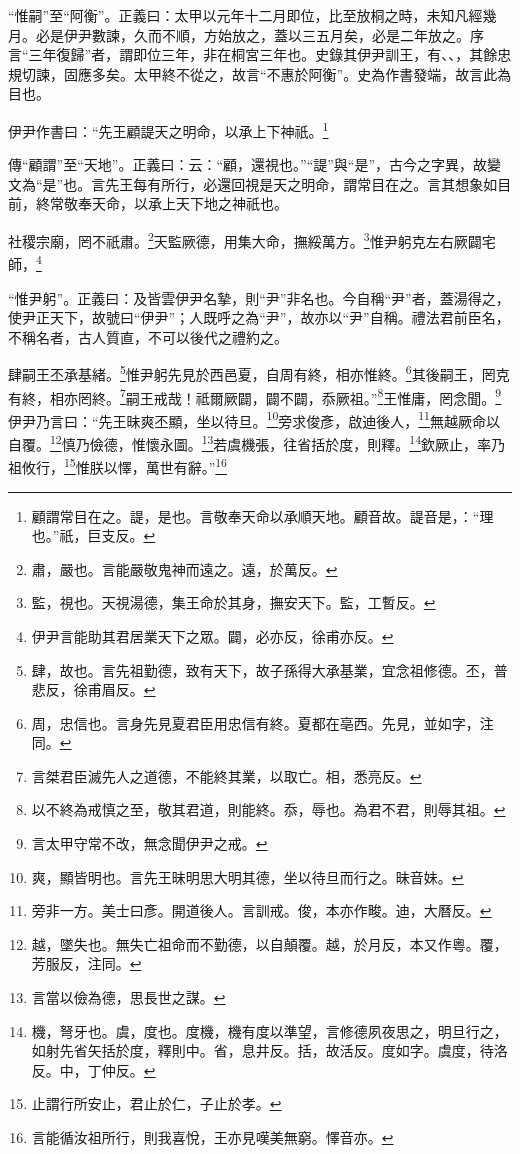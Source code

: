{\noindent\shu{}\fzkt “惟嗣”至“阿衡”。正義曰：太甲以元年十二月即位，比至放桐之時，未知凡經幾月。必是伊尹數諫，久而不順，方始放之，蓋以三五月矣，必是二年放之。序言“三年復歸”者，謂即位三年，非在桐宮三年也。史錄其伊尹訓王，有、、，其餘忠規切諫，固應多矣。太甲終不從之，故言“不惠於阿衡”。史為作書發端，故言此為目也。 \par}

伊尹作書曰：“先王顧諟天之明命，以承上下神祇。\footnote{顧謂常目在之。諟，是也。言敬奉天命以承順天地。顧音故。諟音是，：“理也。”祇，巨支反。}

{\noindent\zhuan{}\fzbyks 傳“顧謂”至“天地”。正義曰：云：“顧，還視也。”“諟”與“是”，古今之字異，故變文為“是”也。言先王每有所行，必還回視是天之明命，謂常目在之。言其想象如目前，終常敬奉天命，以承上天下地之神祇也。 \par}

社稷宗廟，罔不祇肅。\footnote{肅，嚴也。言能嚴敬鬼神而遠之。遠，於萬反。}天監厥德，用集大命，撫綏萬方。\footnote{監，視也。天視湯德，集王命於其身，撫安天下。監，工暫反。}惟尹躬克左右厥闢宅師，\footnote{伊尹言能助其君居業天下之眾。闢，必亦反，徐甫亦反。}

{\noindent\shu{}\fzkt “惟尹躬”。正義曰：及皆雲伊尹名摯，則“尹”非名也。今自稱“尹”者，蓋湯得之，使尹正天下，故號曰“伊尹”；人既呼之為“尹”，故亦以“尹”自稱。禮法君前臣名，不稱名者，古人質直，不可以後代之禮約之。 \par}

肆嗣王丕承基緒。\footnote{肆，故也。言先祖勤德，致有天下，故子孫得大承基業，宜念祖修德。丕，普悲反，徐甫眉反。}惟尹躬先見於西邑夏，自周有終，相亦惟終。\footnote{周，忠信也。言身先見夏君臣用忠信有終。夏都在亳西。先見，並如字，注同。}其後嗣王，罔克有終，相亦罔終。\footnote{言桀君臣滅先人之道德，不能終其業，以取亡。相，悉亮反。}嗣王戒哉！祗爾厥闢，闢不闢，忝厥祖。”\footnote{以不終為戒慎之至，敬其君道，則能終。忝，辱也。為君不君，則辱其祖。}王惟庸，罔念聞。\footnote{言太甲守常不改，無念聞伊尹之戒。}伊尹乃言曰：“先王昧爽丕顯，坐以待旦。\footnote{爽，顯皆明也。言先王昧明思大明其德，坐以待旦而行之。昧音妹。}旁求俊彥，啟迪後人，\footnote{旁非一方。美士曰彥。開道後人。言訓戒。俊，本亦作畯。迪，大曆反。}無越厥命以自覆。\footnote{越，墜失也。無失亡祖命而不勤德，以自顛覆。越，於月反，本又作粵。覆，芳服反，注同。}慎乃儉德，惟懷永圖。\footnote{言當以儉為德，思長世之謀。}若虞機張，往省括於度，則釋。\footnote{機，弩牙也。虞，度也。度機，機有度以準望，言修德夙夜思之，明旦行之，如射先省矢括於度，釋則中。省，息井反。括，故活反。度如字。虞度，待洛反。中，丁仲反。}欽厥止，率乃祖攸行，\footnote{止謂行所安止，君止於仁，子止於孝。}惟朕以懌，萬世有辭。”\footnote{言能循汝祖所行，則我喜悅，王亦見嘆美無窮。懌音亦。}

